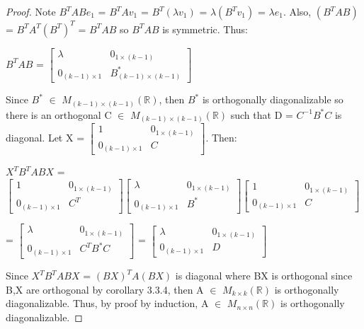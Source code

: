 \begin{proof}
        Note $B^TABe_1$
        = $B^TAv_1$
        = $B^T (\lambda v_1)$
        = $\lambda (B^Tv_1)$
        = $\lambda e_1$.
        Also, $(B^TAB)$ = $B^TA^T(B^T)^T$ = $B^TAB$ so $B^TAB$ is symmetric.
        Thus:

        \hspace{0.5cm}
        $B^TAB$ =
        $\begin{bmatrix}
            \lambda & 0_{1 \times (k-1)} \\
            0_{(k-1) \times 1} & B^*_{(k-1) \times (k-1)}
        \end{bmatrix}$

        Since $B^*$ $\in$ $M_{(k-1) \times (k-1)}(\mathbb{R})$,
        then $B^*$ is orthogonally diagonalizable so there is an orthogonal
        C $\in$ $M_{(k-1) \times (k-1)}(\mathbb{R})$ such that
        D = $C^{-1}B^*C$ is diagonal.
        Let X = $\begin{bmatrix}
            1 & 0_{1 \times (k-1)} \\
            0_{(k-1) \times 1} & C
        \end{bmatrix}$. Then:

        \hspace{0.5cm}
        $X^T B^T A B X$ =
        $\begin{bmatrix}
            1 & 0_{1 \times (k-1)} \\
            0_{(k-1) \times 1} & C^T
        \end{bmatrix}
        \begin{bmatrix}
            \lambda & 0_{1 \times (k-1)} \\
            0_{(k-1) \times 1} & B^*
        \end{bmatrix}
        \begin{bmatrix}
            1 & 0_{1 \times (k-1)} \\
            0_{(k-1) \times 1} & C
        \end{bmatrix}$

        \hspace{2.7cm}
        =
        $\begin{bmatrix}
            \lambda & 0_{1 \times (k-1)} \\
            0_{(k-1) \times 1} & C^TB^*C
        \end{bmatrix}$ =
        $\begin{bmatrix}
            \lambda & 0_{1 \times (k-1)} \\
            0_{(k-1) \times 1} & D
        \end{bmatrix}$

        Since $X^T B^T A B X$ = $(BX)^T A (BX)$ is diagonal
        where BX is orthogonal since B,X are orthogonal
        by {\color{orange} corollary 3.3.4}, then
        A $\in$ $M_{k \times k}(\mathbb{R})$ is orthogonally diagonalizable.
        Thus, by proof by induction, A $\in$ $M_{n \times n}(\mathbb{R})$
        is orthogonally diagonalizable.
    \end{proof}

